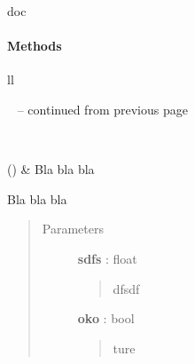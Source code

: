 \documentclass[letterpaper,10pt,english]{sphinxmanual}
\begin{document}
\begin{fulllineitems}
\label{_generated/otpod.UnivariateLinearRegressionPOD:otpod.UnivariateLinearRegressionPOD}
doc
\paragraph{Methods}

\begin{longtable}{ll}
\hline
\endfirsthead

%
{{\textsf{\tablename\ \thetable{} -- continued from previous page}}} \\
\hline
\endhead

\hline {} \\ \hline
\endfoot

\endlastfoot


{\hyperref[_generated/otpod.UnivariateLinearRegressionPOD:otpod.UnivariateLinearRegressionPOD.run]{\emph{}}}()
 & 
Bla bla bla
\\
\hline\end{longtable}


\begin{fulllineitems}
\label{_generated/otpod.UnivariateLinearRegressionPOD:otpod.UnivariateLinearRegressionPOD.run}
Bla bla bla
\begin{quote}\begin{description}
\item[{Parameters}] \leavevmode
\textbf{sdfs} : float
\begin{quote}

dfsdf
\end{quote}

\textbf{oko} : bool
\begin{quote}

ture
\end{quote}

\end{description}\end{quote}

\end{fulllineitems}


\end{fulllineitems}
\end{document}
